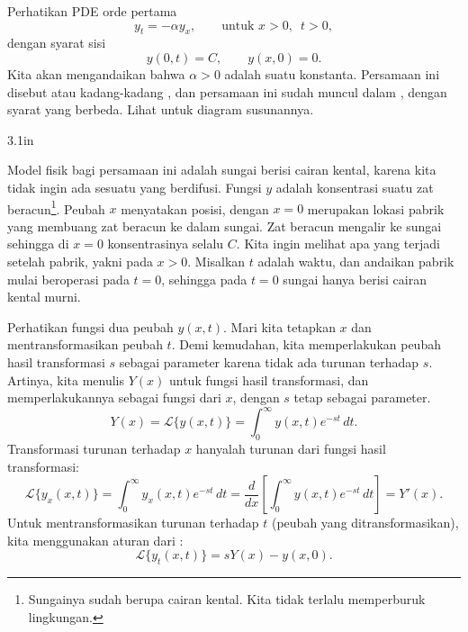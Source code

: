 \begin{example}
Perhatikan PDE orde pertama
\begin{equation*}
y_t = - \alpha y_x, \qquad \text{untuk } x > 0, \enspace t > 0,
\end{equation*}
dengan syarat sisi
\begin{equation*}
y(0,t) = C, \qquad y(x,0) = 0 .
\end{equation*}
Kita akan mengandaikan bahwa $\alpha > 0$ adalah suatu konstanta.
Persamaan ini 
disebut \emph{} atau kadang-kadang
\emph{}, dan persamaan ini sudah
muncul dalam , dengan syarat yang berbeda.
Lihat  untuk diagram susunannya.

\begin{mywrapfig}{3.1in}
\capstart
{}
\caption{Persamaan transpor pada setengah garis.\label{lt:half-infinite-goo-river}}
\end{mywrapfig}

Model fisik bagi persamaan ini adalah sungai berisi cairan kental,
karena kita tidak ingin ada sesuatu yang berdifusi.  Fungsi
$y$ adalah konsentrasi
suatu zat beracun\footnote{Sungainya sudah berupa cairan kental.
Kita tidak terlalu memperburuk lingkungan.}.
Peubah $x$ menyatakan posisi, dengan $x=0$
merupakan lokasi pabrik yang membuang zat beracun ke dalam
sungai.  Zat beracun mengalir ke sungai sehingga di $x=0$
konsentrasinya selalu $C$.  Kita ingin melihat apa yang terjadi setelah pabrik,
yakni pada $x > 0$.  Misalkan $t$ adalah waktu, dan andaikan
pabrik mulai beroperasi pada $t=0$, sehingga pada $t=0$ sungai hanya berisi
cairan kental murni.

Perhatikan fungsi dua peubah $y(x,t)$.
Mari kita tetapkan $x$ dan mentransformasikan peubah $t$.
Demi kemudahan, kita memperlakukan peubah hasil transformasi $s$
sebagai parameter karena tidak ada turunan terhadap $s$.
Artinya, kita menulis $Y(x)$ untuk fungsi hasil transformasi,
dan memperlakukannya sebagai fungsi dari $x$, dengan $s$ tetap sebagai parameter.
\begin{equation*}
Y(x)
= {\mathcal L} \bigl\{ y(x,t) \bigr\}
= \int_0^\infty y(x,t) e^{-st} \,dt .
\end{equation*}
Transformasi turunan terhadap $x$ hanyalah turunan dari 
fungsi hasil transformasi:
\begin{equation*}
{\mathcal L} \bigl\{ y_x(x,t) \bigr\} =
\int_0^\infty y_x(x,t) e^{-st} \,dt
=
\frac{d}{dx} \left[\int_0^\infty y(x,t) e^{-st} \,dt \right]
=
Y'(x) .
\end{equation*}
Untuk mentransformasikan turunan terhadap $t$ (peubah yang ditransformasikan),
kita menggunakan aturan dari :
\begin{equation*}
{\mathcal L} \bigl\{ y_t(x,t) \bigr\} 
=
sY(x) - y(x,0) .
\end{equation*}


\end{example}
